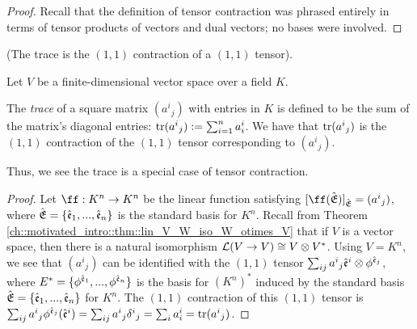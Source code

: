 \begin{proof}
    Recall that the definition of tensor contraction was phrased entirely in terms of tensor products of vectors and dual vectors; no bases were involved.
\end{proof}

\begin{theorem}
    (The trace is the $(1, 1)$ contraction of a $(1, 1)$ tensor).
    
    Let $V$ be a finite-dimensional vector space over a field $K$.
    
    The \textit{trace} of a square matrix $(a^i{}_j)$ with entries in $K$ is defined to be the sum of the matrix's diagonal entries: $\text{tr}(a^i{}_j) := \sum_{i = 1}^n a^i_i$. We have that $\text{tr}(a^i{}_j)$ is the $(1, 1)$ contraction of the $(1, 1)$ tensor corresponding to $(a^i{}_j)$.
    
    Thus, we see the trace is a special case of tensor contraction.
\end{theorem}

\begin{proof}
    Let $\ff:K^n \rightarrow K^n$ be the linear function satisfying $[\ff(\sE)]_\sE = (a^i{}_j)$, where ${\hat{\mathfrak{E}}} = \{\hat{\mathfrak{e}}_1, ..., \hat{\mathfrak{e}}_n\}$ is the standard basis for $K^n$. Recall from Theorem \ref{ch::motivated_intro::thm::lin_V_W_iso_W_otimes_V} that if $V$ is a vector space, then there is a natural isomorphism $\mathcal{L}(V \rightarrow V) \cong V \otimes V^*$. Using $V = K^n$, we see that $(a^i{}_j)$ can be identified with the $(1, 1)$ tensor $\sum_{ij} a^i{}_j \hat{\mathfrak{e}}^i \otimes \phi^{\hat{\mathfrak{e}}_j}$, where $E^* = \{\phi^{\hat{\mathfrak{e}}_1}, ..., \phi^{\hat{\mathfrak{e}}_n}\}$ is the basis for $(K^n)^*$ induced by the standard basis ${\hat{\mathfrak{E}}} = \{\hat{\mathfrak{e}}_1, ..., \hat{\mathfrak{e}}_n\}$ for $K^n$. The $(1, 1)$ contraction of this $(1, 1)$ tensor is $\sum_{ij} a^i{}_j \phi^{\hat{\mathfrak{e}}_j}(\hat{\mathfrak{e}}^i) = \sum_{ij} a^i{}_j \delta^i{}_j = \sum_i a^i_i = \text{tr}(a^i{}_j)$. 
\end{proof}